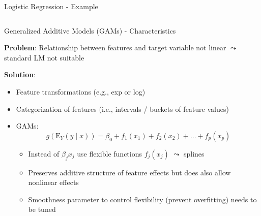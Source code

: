 \documentclass[11pt,compress,t,notes=noshow, aspectratio=169, xcolor=table]{beamer}
\begin{document}
\begin{frame}{Logistic Regression - Example}
\begin{columns}[T]
\begin{column}{0.5\textwidth}
\end{column}
\end{columns}

\end{frame}



\begin{frame}{Generalized Additive Models (GAMs) - Characteristics}

\textbf{Problem}: Relationship between features and target variable not linear $\leadsto$ standard LM not suitable 

\medskip
\pause
\textbf{Solution}: 
 \begin{itemize}
        \item Feature transformations (e.g., exp or log)
        \item Categorization of features (i.e., intervals / buckets of feature values)
        \item GAMs:
        $$g(\mathrm{E}_Y (y\mid x)) = \beta_0 + f_1(x_1) + f_2(x_2) + \ldots + f_p(x_p)$$
    
    \begin{itemize}
        \item Instead of $\beta_j x_j$ use flexible functions $f_j(x_j)$ $\leadsto$ splines
        \item Preserves additive structure of feature effects but does also allow nonlinear effects
        \item Smoothness parameter to control flexibility (prevent overfitting) needs to be tuned
    \end{itemize}
    \end{itemize}
    
    

   

\end{frame}
\end{document}
